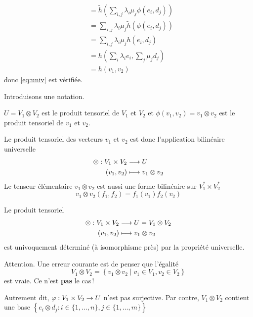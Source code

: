 \begin{theoreme}
\begin{preuve}
\begin{align*}
                                    &= \tilde{h}\left( \sum_{i,j} \lambda_i \mu_j \phi(e_i, d_j) \right) \\
                                    &= \sum_{i, j} \lambda_i \mu_j \tilde{h}(\phi(e_i, d_j)) \\
                                    &= \sum_{i, j} \lambda_i \mu_j h(e_i, d_j) \\
                                    &= h\left( \sum_i \lambda_i e_i, \sum_j \mu_j d_j \right) \\
                                    &= h(v_1,v_2)
    \end{align*}
    donc \eqref{eq:univ} est vérifiée.
  \end{preuve}
\end{theoreme}

Introduisons une notation.
\begin{notation}
  $U = V_1 \otimes V_2$ est le produit tensoriel de $V_1$ et $V_2$ et $\phi(v_1, v_2) = v_1 \otimes v_2$ est le produit tensoriel de $v_1$ et $v_2$.
\end{notation}
Le produit tensoriel des vecteurs $v_1$ et $v_2$ est donc l'application bilinéaire universelle
\begin{align*}
  \otimes: V_1 \times V_2 &\longrightarrow U \\
  (v_1,v_2)&\longmapsto v_1 \otimes v_2
\end{align*}
Le tenseur élémentaire $v_1\otimes v_2$ est aussi une forme bilinéaire sur $V_1^* \times V_2^*$
$$v_1\otimes v_2(f_1,f_2) = f_1(v_1)f_2(v_2)$$

\begin{theoreme}
  Le produit tensoriel
  \begin{align*}
    \otimes : V_1 \times V_2 &\longrightarrow U = V_1\otimes V_2 \\
    (v_1, v_2)&\longmapsto v_1\otimes v_2
  \end{align*}
  est univoquement déterminé (à isomorphisme près) par la propriété universelle.
\end{theoreme}

\begin{remarque}
  Attention. Une erreur courante est de penser que l'égalité
  $$V_1\otimes V_2 = \left\{ v_1 \otimes v_2 \mid v_1 \in V_1, v_2\in V_2 \right\}$$
  est vraie. Ce n'est \textbf{pas} le cas !
  \par Autrement dit, $\varphi: V_1 \times V_2 \rightarrow U$ n'est pas surjective. Par contre, $V_1\otimes V_2$ contient une base $\left\{ e_i\otimes d_j : i \in \{ 1, \dots, n\}, j \in \{ 1, \dots, m\} \right\}$
\end{remarque}


